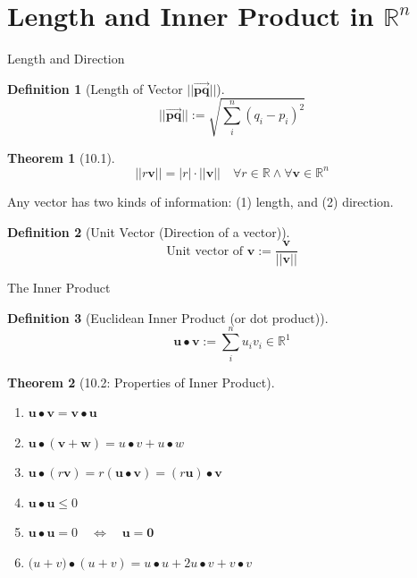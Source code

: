 \documentclass[a4paper,11pt]{article}
\newtheorem{defn}{Definition}
\newtheorem{thm}{Theorem}
\begin{document}

\section{Length and Inner Product in $\mathbb{R}^n$} %
\label{sec:length_and_inner_product_in_mathbb_r_n}
\begin{frame}[t]{Length and Direction}
	\begin{defn}
		[Length of Vector $||\overrightarrow{\mathbf{pq}}||$]
		\[
			||\mathbf{\overrightarrow{pq}}|| := \sqrt{\sum_i^n (q_i-p_i)^2}
		\]
	\end{defn}
	\begin{thm}
		[10.1]\[
			||r\mathbf{v}||=|r|\cdot||\mathbf{v}|| \quad \forall r\in \mathbb{R}\land \forall\mathbf{v}\in\mathbb{R}^n
		\]
	\end{thm}
	Any vector has two kinds of information: (1) length, and  (2) direction. 
	\begin{defn}
		[Unit Vector (Direction of a vector)]
		\[
		\text{Unit vector of }\mathbf{v}:=\frac{\mathbf{v}}{||\mathbf{v}||}
		\]
	\end{defn}
\end{frame}

\begin{frame}[t]{The Inner Product}
	\begin{defn}
		[Euclidean Inner Product (or dot product)]
		\[
			\mathbf{u}\bullet\mathbf{v}:=\sum_i^n u_iv_i \in \mathbb{R}^1
		\]
	\end{defn}
	\begin{thm}
		[10.2: Properties of Inner Product]\begin{enumerate}
			\item $\mathbf{u\bullet v}=\mathbf{v\bullet u}$
			\item $\mathbf{u\bullet(v+w)}=u\bullet v + u\bullet w$
			\item $\mathbf{u}\bullet(r\mathbf{v})=r(\mathbf{u\bullet v})=(r\mathbf{u})\bullet\mathbf{v}$
			\item $\mathbf{u\bullet u}\le 0$
			\item $\mathbf{u\bullet u}=0\quad\iff\quad \mathbf{u}=\mathbf{0}$ 
			\item $\mathbf(u+v)\bullet(u+v)=u\bullet u + 2 u\bullet v + v\bullet v$
		\end{enumerate}
	\end{thm}
\end{frame}
\end{document}
